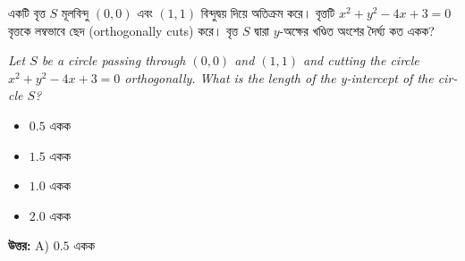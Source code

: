 \documentclass[12pt, a4paper]{article}
\begin{document}
\begin{tcolorbox}[questionbox={প্রশ্ন (Question) 7}]
    \noindent
    একটি বৃত্ত $S$ মূলবিন্দু $(0,0)$ এবং $(1, 1)$ বিন্দুদ্বয় দিয়ে অতিক্রম করে। বৃত্তটি $x^2 + y^2 - 4x + 3 = 0$ বৃত্তকে লম্বভাবে ছেদ (orthogonally cuts) করে। বৃত্ত $S$ দ্বারা $y$-অক্ষের খণ্ডিত অংশের দৈর্ঘ্য কত একক?
    
    \vspace{0.8em}
    \begin{english}
    \noindent\textit{\color{darkgray}
    Let $S$ be a circle passing through $(0,0)$ and $(1, 1)$ and cutting the circle $x^2 + y^2 - 4x + 3 = 0$ orthogonally. What is the length of the y-intercept of the circle $S$?
    }
    \end{english}
\end{tcolorbox}

\begin{itemize}[label={}, leftmargin=1cm, itemsep=0.5em]
    \item[\textbf{A)}] $0.5$ একক
    \item[\textbf{B)}] $1.5$ একক
    \item[\textbf{C)}] $1.0$ একক
    \item[\textbf{D)}] $2.0$ একক
\end{itemize}

\vspace{0.5em}
\begin{tcolorbox}[answerbox]
    \textbf{\color{success} উত্তর:} A) $0.5$ একক
\end{tcolorbox}
\vspace{1em}
\end{document}
